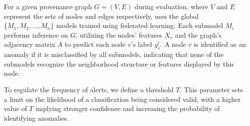 For a given provenance graph \(G = (V, E)\) during evaluation, where \(V\) and \(E\) represent the sets of nodes and edges respectively, \Sys uses the global \(\{M_1, M_2, \ldots, M_n\}\) \gnnshort models trained using federated learning. Each submodel \(M_i\) performs inference on \(G\), utilizing the nodes' features \(X_v\) and the graph's adjacency matrix \(A\) to predict each node \(v\)'s label \(y_v^i\). A node \(v\) is identified as an anomaly if it is misclassified by all submodels, indicating that none of the submodels recognize the neighborhood structure or features displayed by this node. 

To regulate the frequency of alerts, we define a threshold \(T\). This parameter sets a limit on the likelihood of a classification being considered valid, with a higher value of \(T\) implying stronger confidence and increasing the probability of identifying anomalies. 